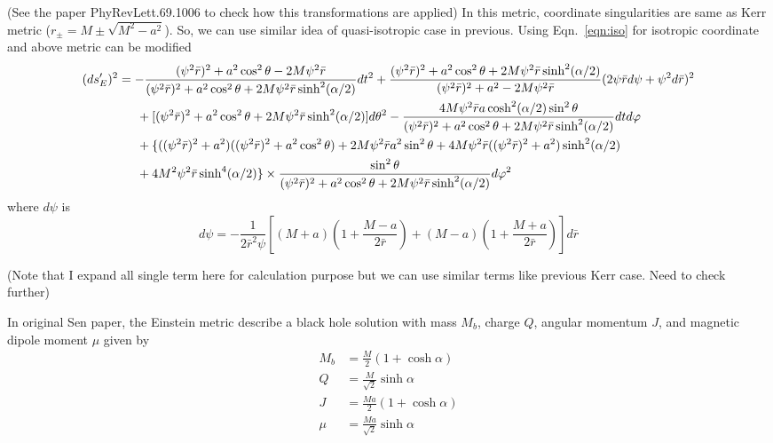 \documentclass[prd]{revtex4}
\begin{document}
(See the paper PhyRevLett.69.1006 to check how this transformations are applied)
In this metric, coordinate singularities are same as Kerr metric ($r_{\pm} = M \pm \sqrt{M^2-a^2}
$). So, we can use similar idea of quasi-isotropic case in previous. Using Eqn.~\ref{eqn:iso} for isotropic coordinate and above metric can be modified
\begin{align}
(d s^\prime_E)^2  &= -\frac{(\psi^2 \bar{r})^2 + a^2 \cos^2 \theta - 2 M \psi^2 \bar{r}}{(\psi^2 \bar{r})^2 + a^2 \cos^2 \theta + 2 M \psi^2 \bar{r} \sinh^2 (\alpha/2)} dt^2 + \frac{(\psi^2 \bar{r})^2 + a^2 \cos^2 \theta + 2 M \psi^2 \bar{r} \sinh^2 (\alpha/2)}{(\psi^2 \bar{r})^2 + a^2 - 2 M \psi^2 \bar{r}} (2 \psi \bar{r} d\psi + \psi^2 d \bar{r})^2 \nonumber \\
			   &\indent + [ (\psi^2 \bar{r})^2 + a^2 \cos^2 \theta + 2 M \psi^2 \bar{r} \sinh^2 (\alpha/2)]d \theta^2 - \frac{4 M \psi^2 \bar{r} a \cosh^2 (\alpha/2) \sin^2 \theta}{(\psi^2 \bar{r})^2 + a^2 \cos^2 \theta + 2 M \psi^2 \bar{r} \sinh^2 (\alpha/2)} dt d\varphi \nonumber \\
			   &\indent + \{ ((\psi^2 \bar{r})^2 + a^2)((\psi^2 \bar{r})^2 + a^2 \cos^2 \theta) + 2 M \psi^2 \bar{r} a^2 \sin^2 \theta + 4 M \psi^2 \bar{r} ((\psi^2 \bar{r})^2 + a^2)\sinh^2 (\alpha/2) \nonumber \\
			   &\indent + 4 M^2 \psi^2 \bar{r} \sinh^4 (\alpha/2) \} \times \frac{ \sin^2 \theta}{(\psi^2 \bar{r})^2 + a^2 \cos^2 \theta + 2 M \psi^2 \bar{r} \sinh^2 (\alpha/2)} d \varphi^2
\end{align}
where $d \psi$ is
\begin{equation}
d \psi = -\frac{1}{2 \bar{r}^2 \psi} \left[ (M+a)\left(1+\frac{M-a}{2 \bar{r}} \right) + (M-a)\left(1+\frac{M+a}{2 \bar{r}} \right) \right] d \bar{r}
\end{equation}

(Note that I expand all single term here for calculation purpose but we can use similar terms like previous Kerr case. Need to check further)

In original Sen paper, the Einstein metric describe a black hole solution with mass $M_b$, charge $Q$, angular momentum $J$, and magnetic dipole moment $\mu$ given by
\begin{align}
M_b &= \frac{M}{2} (1+\cosh \alpha) \\
Q &= \frac{M}{\sqrt{2}} \sinh \alpha \\
J &= \frac{M a}{2} (1+\cosh \alpha) \\
\mu &=\frac{M a}{\sqrt{2}} \sinh \alpha
\end{align}
\end{document}
